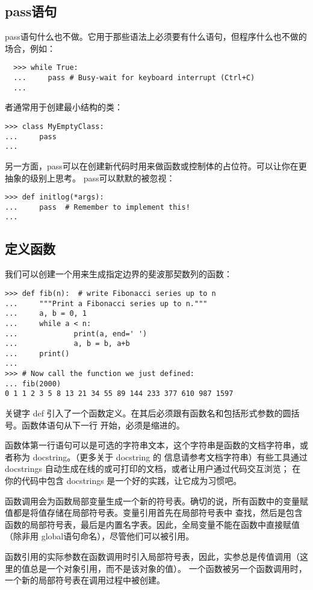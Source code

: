 \documentclass[UTF8]{ctexart}
\begin{document}
\subsection{pass语句}
pass语句什么也不做。它用于那些语法上必须要有什么语句，但程序什么也不做的场合，例如：
\begin{verbatim}
  >>> while True:
  ...     pass # Busy-wait for keyboard interrupt (Ctrl+C)
  ...
\end{verbatim}
者通常用于创建最小结构的类：
\begin{verbatim}
>>> class MyEmptyClass:
...     pass
...
\end{verbatim}
另一方面，pass可以在创建新代码时用来做函数或控制体的占位符。可以让你在更抽象的级别上思考。
pass可以默默的被忽视：
\begin{verbatim}
>>> def initlog(*args):
...     pass  # Remember to implement this!
...
\end{verbatim}

\subsection{定义函数}
我们可以创建一个用来生成指定边界的斐波那契数列的函数：
\begin{verbatim}
>>> def fib(n):  # write Fibonacci series up to n
...     """Print a Fibonacci series up to n."""
...     a, b = 0, 1
...     while a < n:
...             print(a, end=' ')
...             a, b = b, a+b
...     print()
...
>>> # Now call the function we just defined:
... fib(2000)
0 1 1 2 3 5 8 13 21 34 55 89 144 233 377 610 987 1597
\end{verbatim}

关键字 def 引入了一个函数定义。在其后必须跟有函数名和包括形式参数的圆括号。函数体语句从下一行
开始，必须是缩进的。

函数体第一行语句可以是可选的字符串文本，这个字符串是函数的文档字符串，或者称为 docstring。（更多关于 docstring 的
信息请参考文档字符串）有些工具通过 docstrings 自动生成在线的或可打印的文档，或者让用户通过代码交互浏览；
在你的代码中包含 docstrings 是一个好的实践，让它成为习惯吧。

函数调用会为函数局部变量生成一个新的符号表。确切的说，所有函数中的变量赋值都是将值存储在局部符号表。变量引用首先在局部符号表中
查找，然后是包含函数的局部符号表，最后是内置名字表。因此，全局变量不能在函数中直接赋值（除非用 global语句命名），尽管他们可以被引用。

函数引用的实际参数在函数调用时引入局部符号表，因此，实参总是传值调用（这里的值总是一个对象引用，而不是该对象的值）。
一个函数被另一个函数调用时，一个新的局部符号表在调用过程中被创建。
\end{document}
